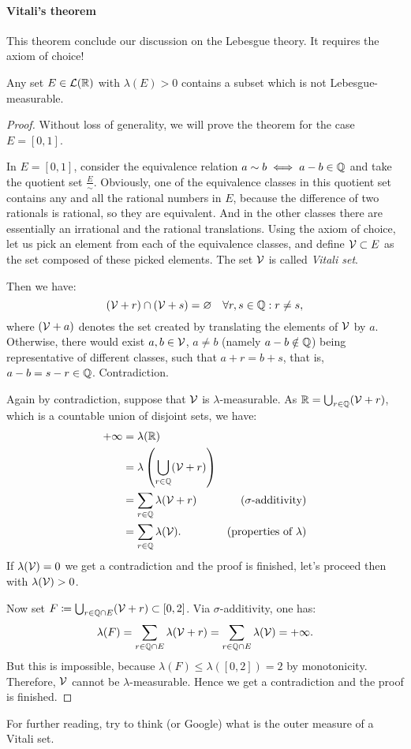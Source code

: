 \paragraph{Vitali's theorem} This theorem conclude our discussion on the Lebesgue theory. It requires the axiom of choice!
\begin{theo}[Vitali]
	Any set $E \in\mathcal L(\mathbb R)$ with $\lambda(E)>0$ contains a subset which is not Lebesgue-measurable.
\end{theo}

\begin{proof}
	Without loss of generality, we will prove the theorem for the case $E=[0,1]$. 
	
	In $E=[0,1]$, consider the equivalence relation $a \sim b \iff a-b \in \mathbb Q$ and
	take the quotient set $\frac E \sim$. Obviously, one of the equivalence classes
	in this quotient set contains any and all the rational numbers in $E$, because the difference of two rationals is rational, so they are equivalent. And in the other classes there are essentially an irrational and the rational translations. Using the axiom of choice, let us pick an element from each of the equivalence classes, and define $\mathcal V \subset E$ as the set composed of these picked elements. The set $\mathcal V$ is called \emph{Vitali set}.
	
	Then we have:
	$$	
		(\mathcal V+r) \cap (\mathcal V+s) 
		= \varnothing 
		\quad \forall r,s \in \mathbb Q : r \neq s
	,
	$$ 
	where $(\mathcal V+a)$ denotes the set created by translating the elements of $\mathcal V$ by $a$. \\
	Otherwise, there would exist $a, b \in \mathcal V$, $a \neq b$ (namely $a-b\notin\mathbb Q$) being representative of different classes, such that $a+r = b+s$, that is, $a-b=s-r \in \mathbb Q$. Contradiction.
	
	Again by contradiction, suppose that $\mathcal V$ is $\lambda$-measurable. As $\mathbb R = \bigcup_{r \in \mathbb Q} (\mathcal V+r)$, which is a countable union of disjoint sets, we have:
	\begin{align*}
		+\infty &= \lambda(\mathbb R)\\
		& = \lambda \left(\bigcup_{r \in \mathbb Q} (\mathcal V+r)\right) \\
		& = \sum_{r \in \mathbb Q} \lambda(\mathcal V+r) &\text{($\sigma$-additivity)}\\
		& = \sum_{r \in \mathbb Q} \lambda(\mathcal V). &\text{(properties of $\lambda$)}
	\end{align*}
	If $\lambda(\mathcal V)=0$ we get a contradiction and the proof is finished, let's proceed then with $\lambda(\mathcal V) > 0$.
	
	Now set $F \coloneqq \bigcup_{r \in \mathbb Q \cap E} (\mathcal V+r) \subset[0,2]$. Via $\sigma$-additivity, one has:
	$$
		\lambda(F) = \sum_{r \in \mathbb Q \cap E} \lambda(\mathcal V+r)
		= \sum_{r \in \mathbb Q \cap E} \lambda(\mathcal V) 
		= + \infty
	.
	$$
	But this is impossible, because $\lambda(F) \le \lambda([0,2]) = 2$ by monotonicity. Therefore, $\mathcal V$ cannot be $\lambda$-measurable. Hence we get a contradiction and the proof is finished.
\end{proof}

For further reading, try to think (or Google) what is the outer measure of a Vitali set.
